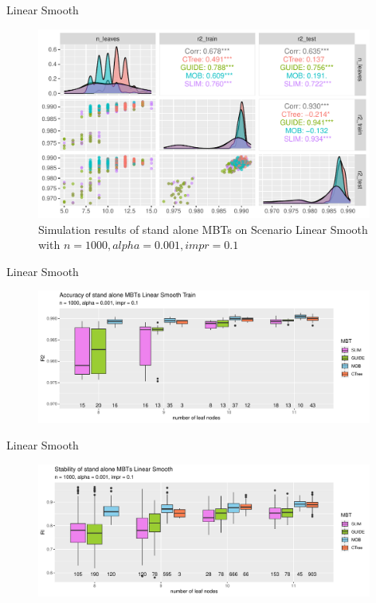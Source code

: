 \documentclass[9pt, xcolor=table]{beamer}
\begin{document}
\begin{frame}{Linear Smooth}
\begin{figure}
\caption{Simulation results of stand alone MBTs on Scenario Linear Smooth with $n = 1000, alpha = 0.001, impr = 0.1$}
    \includegraphics[width=11cm]{Figures/simulations/batchtools/basic_scenarios/linear_smooth/ls_1000_standalone_r2_nleaves.pdf}
\end{figure}   

    
\end{frame}

\begin{frame}{Linear Smooth}
\begin{figure}
    \includegraphics[width=11cm]{Figures/simulations/batchtools/basic_scenarios/linear_smooth/ls_1000_standalone_r2_train.pdf}
\end{figure}  
    
\end{frame}

\begin{frame}{Linear Smooth}
\begin{figure}
    \includegraphics[width=11cm]{Figures/simulations/batchtools/basic_scenarios/linear_smooth/ls_1000_standalone_sta.pdf}
\end{figure}  
    
\end{frame}
\end{document}
